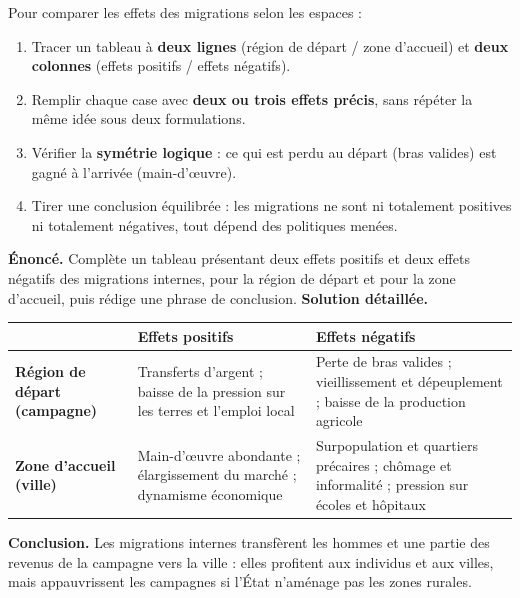 \documentclass[11pt]{article}
\begin{document}
\begin{methode}
Pour comparer les effets des migrations selon les espaces :
\begin{enumerate}
\item Tracer un tableau à \textbf{deux lignes} (région de départ / zone d'accueil) et \textbf{deux colonnes} (effets positifs / effets négatifs).
\item Remplir chaque case avec \textbf{deux ou trois effets précis}, sans répéter la même idée sous deux formulations.
\item Vérifier la \textbf{symétrie logique} : ce qui est perdu au départ (bras valides) est gagné à l'arrivée (main-d'œuvre).
\item Tirer une conclusion équilibrée : les migrations ne sont ni totalement positives ni totalement négatives, tout dépend des politiques menées.
\end{enumerate}
\end{methode}

\begin{exoresolu}
\textbf{Énoncé.} Complète un tableau présentant deux effets positifs et deux effets négatifs des migrations internes, pour la région de départ et pour la zone d'accueil, puis rédige une phrase de conclusion.
\tcblower
\textbf{Solution détaillée.}
\begin{center}
\begin{tabularx}{\linewidth}{|l|X|X|}\hline
\rowcolor{popblueL} & \textbf{Effets positifs} & \textbf{Effets négatifs} \\ \hline
\textbf{Région de départ (campagne)} & Transferts d'argent ; baisse de la pression sur les terres et l'emploi local & Perte de bras valides ; vieillissement et dépeuplement ; baisse de la production agricole \\ \hline
\textbf{Zone d'accueil (ville)} & Main-d'œuvre abondante ; élargissement du marché ; dynamisme économique & Surpopulation et quartiers précaires ; chômage et informalité ; pression sur écoles et hôpitaux \\ \hline
\end{tabularx}
\end{center}
\textbf{Conclusion.} Les migrations internes transfèrent les hommes et une partie des revenus de la campagne vers la ville : elles profitent aux individus et aux villes, mais appauvrissent les campagnes si l'État n'aménage pas les zones rurales.
\end{exoresolu}
\end{document}
